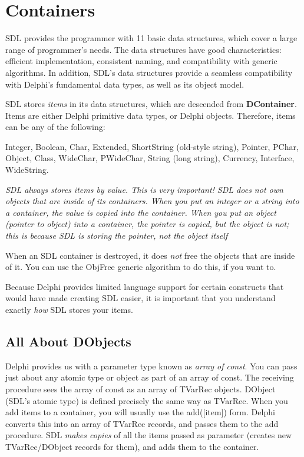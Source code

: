 \documentclass{report}
\begin{document}
\chapter{Containers}

SDL provides the programmer with 11 basic data structures, which cover a
large range of programmer's needs. The data structures have good
characteristics: efficient implementation, consistent naming, and
compatibility with generic algorithms. In addition, SDL's data structures
provide a seamless compatibility with Delphi's fundamental data types, as
well as its object model.

SDL stores \emph{items} in its data structures, which are descended from
\textbf{DContainer}. Items are either Delphi primitive data types, or Delphi
objects. Therefore, items can be any of the following:

Integer, Boolean, Char, Extended, ShortString (old-style string), Pointer,
PChar, Object, Class, WideChar, PWideChar, String (long string), Currency,
Interface, WideString.

\emph{SDL always stores items by value. This is very important! SDL
does not own objects that are inside of its containers. When you put an
integer or a string into a container, the value is copied into the
container. When you put an object (pointer to object) into a container, the
pointer is copied, but the object is not; this is because SDL is storing the
pointer, not the object itself}

When an SDL container is destroyed, it does \emph{not} free the objects that
are inside of it. You can use the ObjFree generic algorithm to do this, if
you want to.

Because Delphi provides limited language support for certain constructs that
would have made creating SDL easier, it is important that you understand
exactly \emph{how} SDL stores your items.

\section{All About DObjects}

Delphi provides us with a parameter type known as \emph{array of const}.
You can pass just about any atomic type or object as part of an array of
const. The receiving procedure sees the array of const as an array of
TVarRec objects. DObject (SDL's atomic type) is defined precisely the same
way as TVarRec. When you add items to a container, you will usually use the
add([item]) form. Delphi converts this into an array of TVarRec records, and
passes them to the add procedure. SDL \emph{makes copies} of all the items
passed as parameter (creates new TVarRec/DObject records for them), and adds
them to the container.
\end{document}
